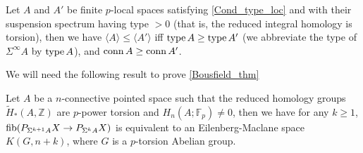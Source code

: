 	\begin{thm}[Bousfield]\label{Bousfield_thm}
		Let $A$ and $A'$ be finite $p$-local spaces satisfying \cref{Cond_type_loc} and with their suspension spectrum having type $>0$ (that is, the reduced integral homology is torsion), then we have $\langle A\rangle\leq\langle A'\rangle$ iff $\operatorname{\mathrm{type}} A\geq\operatorname{\mathrm{type}} A'$ (we abbreviate the type of $\Sigma^\infty A$ by $\operatorname{\mathrm{type}} A$), and $\operatorname{\mathrm{conn}} A\geq\operatorname{\mathrm{conn}} A'$. 
	\end{thm}

	We will need the following result to prove \cref{Bousfield_thm}

	\begin{thm}\label{Fib_null_susp_EM_tors}
		Let $A$ be a $n$-connective pointed space such that the reduced homology groups $\tilde{H}_*(A,\mathbb{Z})$ are $p$-power torsion and $H_n(A;\mathbb{F}_p)\neq0$, then we have for any $k\geq1$, $\operatorname{\mathrm{fib}}(P_{\Sigma^{k+1}A}X\to P_{\Sigma^kA}X)$ is equivalent to an Eilenberg-Maclane space $K(G,n+k)$, where $G$ is a $p$-torsion Abelian group. 
	\end{thm}
